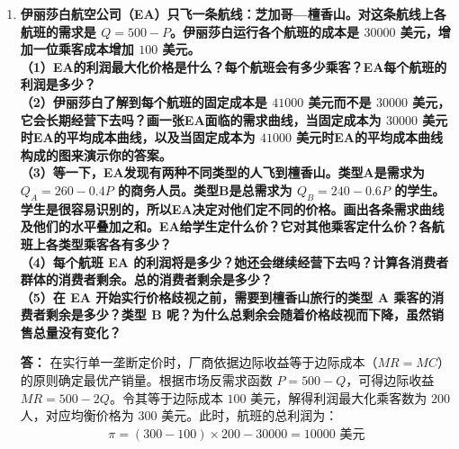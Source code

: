 \begin{enumerate}[label=\textbf{\arabic*.}, leftmargin=*]
\begin{center}
		\end{center}
		\newpage
		\item \textbf{伊丽莎白航空公司（EA）只飞一条航线：芝加哥—檀香山。对这条航线上各航班的需求是 $Q = 500 - P$。伊丽莎白运行各个航班的成本是 $30000$ 美元，增加一位乘客成本增加 $100$ 美元。\\（1）EA的利润最大化价格是什么？每个航班会有多少乘客？EA每个航班的利润是多少？\\（2）伊丽莎白了解到每个航班的固定成本是 $41000$ 美元而不是 $30000$ 美元，它会长期经营下去吗？画一张EA面临的需求曲线，当固定成本为 $30000$ 美元时EA的平均成本曲线，以及当固定成本为 $41000$ 美元时EA的平均成本曲线构成的图来演示你的答案。\\（3）等一下，EA发现有两种不同类型的人飞到檀香山。类型A是需求为 $Q_A = 260 - 0.4P$ 的商务人员。类型B是总需求为 $Q_B = 240 - 0.6P$ 的学生。学生是很容易识别的，所以EA决定对他们定不同的价格。画出各条需求曲线及他们的水平叠加之和。EA给学生定什么价？它对其他乘客定什么价？各航班上各类型乘客各有多少？\\（4）每个航班 EA 的利润将是多少？她还会继续经营下去吗？计算各消费者群体的消费者剩余。总的消费者剩余是多少？\\（5）在 EA 开始实行价格歧视之前，需要到檀香山旅行的类型 A 乘客的消费者剩余是多少？类型 B 呢？为什么总剩余会随着价格歧视而下降，虽然销售总量没有变化？}
		
		\textbf{答：}
		在实行单一垄断定价时，厂商依据边际收益等于边际成本（$MR = MC$）的原则确定最优产销量。根据市场反需求函数 $P = 500 - Q$，可得边际收益 $MR = 500 - 2Q$。令其等于边际成本 $100$ 美元，解得利润最大化乘客数为 $200$ 人，对应均衡价格为 $300$ 美元。此时，航班的总利润为：
		\[
		\begin{aligned}
			\pi = (300 - 100) \times 200 - 30000 = 10000 \text{ 美元}
		\end{aligned}
		\]
		

\end{enumerate}
